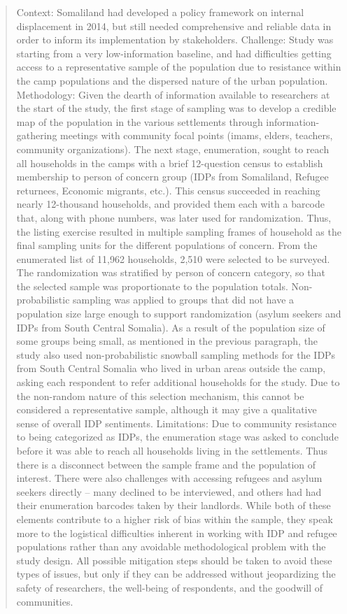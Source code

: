 \documentclass[
]{article}
\begin{document}
\begin{quote}
Context: Somaliland had developed a policy framework on internal displacement in 2014, but still needed comprehensive and reliable data in order to inform its implementation by stakeholders.
Challenge: Study was starting from a very low-information baseline, and had difficulties getting access to a representative sample of the population due to resistance within the camp populations and the dispersed nature of the urban population.
Methodology:
Given the dearth of information available to researchers at the start of the study, the first stage of sampling was to develop a credible map of the population in the various settlements through information-gathering meetings with community focal points (imams, elders, teachers, community organizations). The next stage, enumeration, sought to reach all households in the camps with a brief 12-question census to establish membership to person of concern group (IDPs from Somaliland, Refugee returnees, Economic migrants, etc.). This census succeeded in reaching nearly 12-thousand households, and provided them each with a barcode that, along with phone numbers, was later used for randomization. Thus, the listing exercise resulted in multiple sampling frames of household as the final sampling units for the different populations of concern.
From the enumerated list of 11,962 households, 2,510 were selected to be surveyed. The randomization was stratified by person of concern category, so that the selected sample was proportionate to the population totals. Non-probabilistic sampling was applied to groups that did not have a population size large enough to support randomization (asylum seekers and IDPs from South Central Somalia).
As a result of the population size of some groups being small, as mentioned in the previous paragraph, the study also used non-probabilistic snowball sampling methods for the IDPs from South Central Somalia who lived in urban areas outside the camp, asking each respondent to refer additional households for the study. Due to the non-random nature of this selection mechanism, this cannot be considered a representative sample, although it may give a qualitative sense of overall IDP sentiments.
Limitations:
Due to community resistance to being categorized as IDPs, the enumeration stage was asked to conclude before it was able to reach all households living in the settlements. Thus there is a disconnect between the sample frame and the population of interest. There were also challenges with accessing refugees and asylum seekers directly -- many declined to be interviewed, and others had had their enumeration barcodes taken by their landlords. While both of these elements contribute to a higher risk of bias within the sample, they speak more to the logistical difficulties inherent in working with IDP and refugee populations rather than any avoidable methodological problem with the study design. All possible mitigation steps should be taken to avoid these types of issues, but only if they can be addressed without jeopardizing the safety of researchers, the well-being of respondents, and the goodwill of communities.

\end{quote}
\end{document}
